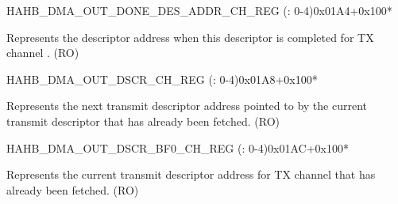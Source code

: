 \begin{register}{H}{AHB\_DMA\_OUT\_DONE\_DES\_ADDR\_CH\_REG (: 0-4)}{0x01A4+0x100*}\label{regdesc:AHBDMAOUTDONEDESADDRCHNREG}
%
\regnewline%
\begin{regdesc}\begin{reglist}
\label{fielddesc:AHBDMAOUTDONEDESADDRCHN}\item [AHB\_DMA\_OUT\_DONE\_DES\_ADDR\_CH\regindex{n}] Represents the descriptor address when this descriptor is completed for TX channel . (RO)
\end{reglist}\end{regdesc}
\end{register}


\begin{register}{H}{AHB\_DMA\_OUT\_DSCR\_CH\_REG (: 0-4)}{0x01A8+0x100*}\label{regdesc:AHBDMAOUTDSCRCHNREG}
%
\regnewline%
\begin{regdesc}\begin{reglist}
\label{fielddesc:AHBDMAOUTLINKDSCRCHN}\item [AHB\_DMA\_OUTLINK\_DSCR\_CH\regindex{n}] Represents the next transmit descriptor address pointed to by the current transmit descriptor that has already been fetched. (RO)
\end{reglist}\end{regdesc}
\end{register}


\begin{register}{H}{AHB\_DMA\_OUT\_DSCR\_BF0\_CH\_REG (: 0-4)}{0x01AC+0x100*}\label{regdesc:AHBDMAOUTDSCRBF0CHNREG}
%
\regnewline%
\begin{regdesc}\begin{reglist}
\label{fielddesc:AHBDMAOUTLINKDSCRBF0CHN}\item [AHB\_DMA\_OUTLINK\_DSCR\_BF0\_CH\regindex{n}] Represents the current transmit descriptor address for TX channel  that has already been fetched. (RO)
\end{reglist}\end{regdesc}
\end{register}


